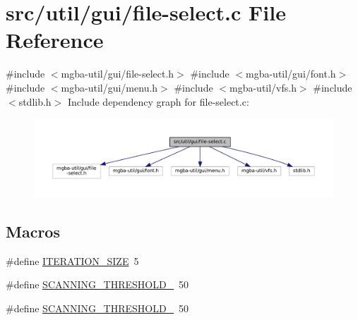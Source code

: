 \hypertarget{file-select_8c}{}\section{src/util/gui/file-\/select.c File Reference}
\label{file-select_8c}
{\ttfamily \#include $<$mgba-\/util/gui/file-\/select.\+h$>$}\newline
{\ttfamily \#include $<$mgba-\/util/gui/font.\+h$>$}\newline
{\ttfamily \#include $<$mgba-\/util/gui/menu.\+h$>$}\newline
{\ttfamily \#include $<$mgba-\/util/vfs.\+h$>$}\newline
{\ttfamily \#include $<$stdlib.\+h$>$}\newline
Include dependency graph for file-\/select.c\+:
\nopagebreak
\begin{figure}[H]
\begin{center}
\leavevmode
\includegraphics[width=350pt]{file-select_8c__incl}
\end{center}
\end{figure}
\subsection*{Macros}
\begin{DoxyCompactItemize}
\item 
\#define \mbox{\hyperlink{file-select_8c_a3ad638821db1c150fa4ecda36a1dda01}{I\+T\+E\+R\+A\+T\+I\+O\+N\+\_\+\+S\+I\+ZE}}~5
\item 
\#define \mbox{\hyperlink{file-select_8c_a0e52e463a0c3af52d2c929663a92d876}{S\+C\+A\+N\+N\+I\+N\+G\+\_\+\+T\+H\+R\+E\+S\+H\+O\+L\+D\+\_}}~50
\item 
\#define \mbox{\hyperlink{file-select_8c_a802b33edb86b450d0529f0c9fb9a8556}{S\+C\+A\+N\+N\+I\+N\+G\+\_\+\+T\+H\+R\+E\+S\+H\+O\+L\+D\+\_}}~50
\end{DoxyCompactItemize}
